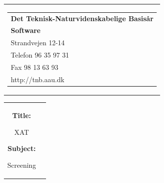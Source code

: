 \thispagestyle{empty}
\begin{titlepage}
\begin{nopagebreak}
\setcounter{page}{3}
{\samepage 
\begin{tabular}{r}
\parbox{\textwidth}{  
\hfill \parbox{4.9cm}{\begin{tabular}{l}
{\sf\small \textbf{Det Teknisk-Naturvidenskabelige Basis{\aa}r }}\\
{\sf\small  \textbf{Software}} \\
{\sf\small Strandvejen 12-14} \\
{\sf\small Telefon 96 35 97 31} \\
{\sf\small Fax 98 13 63 93} \\
{\sf\small http://tnb.aau.dk}
\end{tabular}}}
\\
\end{tabular}

\begin{tabular}{cc}
\parbox{6cm}{
\begin{description}

\item {\bf Title:} 

XAT
  
\item {\bf Subject:} 

Screening

\end{description}

\parbox{8cm}{

}}
\end{tabular}}
\end{nopagebreak}
\end{titlepage}
